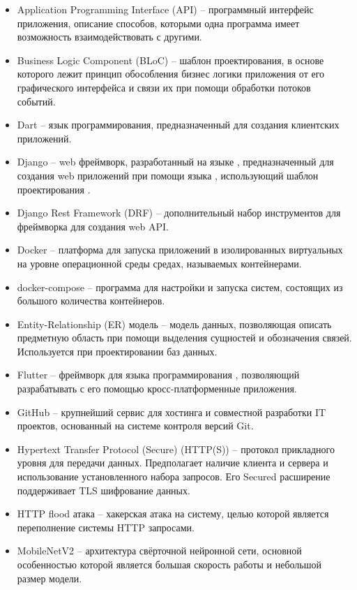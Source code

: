 

\begin{itemize}
	\item Application Programming Interface (API) -- программный интерфейс приложения, описание способов, которыми одна программа имеет возможность взаимодействовать с другими.
	\item Business Logic Component (BLoC) -- шаблон проектирования, в основе которого лежит принцип обособления бизнес логики приложения от его графического интерфейса и связи их при помощи обработки потоков событий.
	\item Dart -- язык программирования, предназначенный для создания клиентских приложений.
	\item Django -- web фреймворк, разработанный на языке , предназначенный для создания web приложений при помощи языка , использующий шаблон проектирования .
	\item Django Rest Framework (DRF) -- дополнительный набор инструментов для фреймворка  для создания web API.
	\item Docker -- платформа для запуска приложений в изолированных виртуальных на уровне операционной среды средах, называемых контейнерами.
	\item docker-compose -- программа для настройки и запуска систем, состоящих из большого количества  контейнеров.
	\item Entity-Relationship (ER) модель -- модель данных, позволяющая описать предметную область при помощи выделения сущностей и обозначения связей. Используется при проектировании баз данных.
	\item Flutter -- фреймворк для языка программирования , позволяющий разрабатывать с его помощью кросс-платформенные приложения.
	\item GitHub -- крупнейший сервис для хостинга и совместной разработки IT проектов, основанный на системе контроля версий Git.
	\item Hypertext Transfer Protocol (Secure) (HTTP(S)) -- протокол прикладного уровня для передачи данных. Предполагает наличие клиента и сервера и использование установленного набора запросов. Его Secured расширение поддерживает TLS шифрование данных.
	\item HTTP flood атака -- хакерская атака на систему, целью которой является переполнение системы HTTP запросами.
	\item MobileNetV2 -- архитектура свёрточной нейронной сети, основной особенностью которой является большая скорость работы и небольшой размер модели.

\end{itemize}
